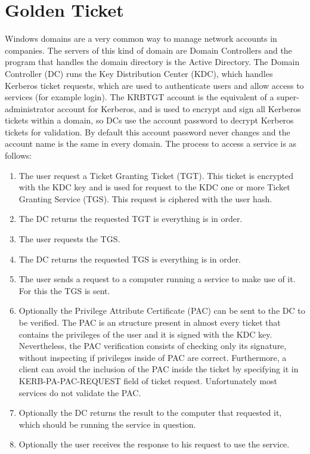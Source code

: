 \section{Golden Ticket}
Windows domains are a very common way to manage network accounts in companies. The servers of this kind of domain are Domain Controllers and the program that handles the domain directory is the Active Directory. The Domain Controller (DC) runs the Key Distribution Center (KDC), which handles Kerberos ticket requests, which are used to authenticate users and allow access to services (for example login).
\linej
The KRBTGT account is the equivalent of a super-administrator account for Kerberos, and is used to encrypt and sign all Kerberos tickets within a domain, so DCs use the account password to decrypt Kerberos tickets for validation. By default this account password never changes and the account name is the same in every domain\cite{stealthbits}.
\linej
\linej
The process to access a service is as follows\cite{tarlogic_theory}\cite{tarlogic_comprehension}\cite{events_1}:
\begin{enumerate}
	\item The user request a Ticket Granting Ticket (TGT). This ticket is encrypted with the KDC key and is used for request to the KDC one or more Ticket Granting Service (TGS). This request is ciphered with the user hash.
	\item The DC returns the requested TGT is everything is in order.
	\item The user requests the TGS.
	\item The DC returns the requested TGS is everything is in order.
	\item The user sends a request to a computer running a service to make use of it. For this the TGS is sent.
	\item Optionally the Privilege Attribute Certificate (PAC) can be sent to the DC to be verified. The PAC is an structure present in almost every ticket that contains the privileges of the user and it is signed with the KDC key. Nevertheless, the PAC verification consists of checking only its signature, without inspecting if privileges inside of PAC are correct. Furthermore, a client can avoid the inclusion of the PAC inside the ticket by specifying it in KERB-PA-PAC-REQUEST field of ticket request. Unfortunately most services do not validate the PAC.
	\item Optionally the DC returns the result to the computer that requested it, which should be running the service in question.
	\item Optionally the user receives the response to his request to use the service.
\end{enumerate}

